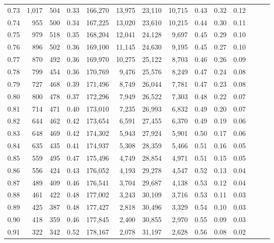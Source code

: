 \begin{tabular}{rrrrrrrrrrrrrr}
0.73 &  1,017 &  504 &  0.33 &  166,270 &   13,975 &  23,110 &  10,715 &  0.43 &  0.32 &      0.12 \\
0.74 &    955 &  500 &  0.34 &  167,225 &   13,020 &  23,610 &  10,215 &  0.44 &  0.30 &      0.11 \\
0.75 &    979 &  518 &  0.35 &  168,204 &   12,041 &  24,128 &   9,697 &  0.45 &  0.29 &      0.10 \\
0.76 &    896 &  502 &  0.36 &  169,100 &   11,145 &  24,630 &   9,195 &  0.45 &  0.27 &      0.10 \\
0.77 &    870 &  492 &  0.36 &  169,970 &   10,275 &  25,122 &   8,703 &  0.46 &  0.26 &      0.09 \\
0.78 &    799 &  454 &  0.36 &  170,769 &    9,476 &  25,576 &   8,249 &  0.47 &  0.24 &      0.08 \\
0.79 &    727 &  468 &  0.39 &  171,496 &    8,749 &  26,044 &   7,781 &  0.47 &  0.23 &      0.08 \\
0.80 &    800 &  478 &  0.37 &  172,296 &    7,949 &  26,522 &   7,303 &  0.48 &  0.22 &      0.07 \\
0.81 &    714 &  471 &  0.40 &  173,010 &    7,235 &  26,993 &   6,832 &  0.49 &  0.20 &      0.07 \\
0.82 &    644 &  462 &  0.42 &  173,654 &    6,591 &  27,455 &   6,370 &  0.49 &  0.19 &      0.06 \\
0.83 &    648 &  469 &  0.42 &  174,302 &    5,943 &  27,924 &   5,901 &  0.50 &  0.17 &      0.06 \\
0.84 &    635 &  435 &  0.41 &  174,937 &    5,308 &  28,359 &   5,466 &  0.51 &  0.16 &      0.05 \\
0.85 &    559 &  495 &  0.47 &  175,496 &    4,749 &  28,854 &   4,971 &  0.51 &  0.15 &      0.05 \\
0.86 &    556 &  424 &  0.43 &  176,052 &    4,193 &  29,278 &   4,547 &  0.52 &  0.13 &      0.04 \\
0.87 &    489 &  409 &  0.46 &  176,541 &    3,704 &  29,687 &   4,138 &  0.53 &  0.12 &      0.04 \\
0.88 &    461 &  422 &  0.48 &  177,002 &    3,243 &  30,109 &   3,716 &  0.53 &  0.11 &      0.03 \\
0.89 &    425 &  387 &  0.48 &  177,427 &    2,818 &  30,496 &   3,329 &  0.54 &  0.10 &      0.03 \\
0.90 &    418 &  359 &  0.46 &  177,845 &    2,400 &  30,855 &   2,970 &  0.55 &  0.09 &      0.03 \\
0.91 &    322 &  342 &  0.52 &  178,167 &    2,078 &  31,197 &   2,628 &  0.56 &  0.08 &      0.02 \\

\end{tabular}
